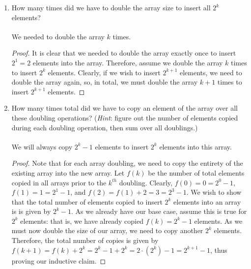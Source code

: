 \documentclass[11pt]{article}
\begin{document}
\begin{enumerate}
\begin{enumerate}
\item
How many times did we have to double the array size to insert all $2^k$
elements?
\\ \\
We needed to double the array $k$ times.
\begin{proof}
It is clear that we needed to double the array exactly once to insert $2^1=2$ elements into the array.  Therefore, assume we double the array $k$ times to insert $2^k$ elements.  Clearly, if we wish to insert $2^{k+1}$ elements, we need to double the array again, so, in total, we must double the array $k+1$ times to insert $2^{k+1}$ elements.
\end{proof}
\item
How many times total did we have to copy an element of the array over all 
these doubling operations?  (\textit{Hint}: figure out the
number of elements copied during each doubling operation, then sum over
all doublings.)
\\ \\
We will always copy $2^k-1$ elements to insert $2^k$ elements into this array.
\begin{proof}
Note that for each array doubling, we need to copy the entirety of the existing array into the new array.  Let $f(k)$ be the number of total elements copied in all arrays prior to the $k^{th}$ doubling.  Clearly, $f(0) = 0=2^0-1$, $f(1) = 1=2^1-1$, and $f(2)= f(1) + 2=3= 2^{3}-1$.  We wish to show that the total number of elements copied to insert $2^k$ elements into an array is is given by $2^k-1$.  As we already have our base case, assume this is true for $2^k$ elements: that is, we have already copied $f(k)=2^k-1$ elements.  As we must now double the size of our array, we need to copy another $2^k$ elements.  Therefore, the total number of copies is given by $f(k+1)=f(k)+2^k = 2^k-1 + 2^k = 2\cdot(2^k) -1 = 2^{k+1}-1$, thus proving our inductive claim.
\end{proof}


\end{enumerate}
\end{enumerate}
\end{document}

